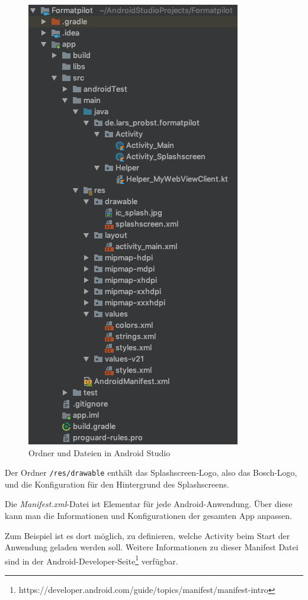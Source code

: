 \begin{figure}[h]
    \centering
    \includegraphics[scale=0.3]{images/kapitel_4/android_folder.png}
    \caption{Ordner und Dateien in Android Studio}
    \label{fig:umsetzung_android_folder}
\end{figure}

Der Ordner \texttt{/res/drawable} enthält das Splashscreen-Logo, also das Bosch-Logo, und die Konfiguration für den
Hintergrund des Splashscreens.

Die \textit{Manifest.xml}-Datei ist Elementar für jede Android-Anwendung. Über diese kann man die Informationen und
Konfigurationen der gesamten App anpassen.

Zum Beispiel ist es dort möglich, zu definieren, welche Activity beim Start der Anwendung geladen werden soll. Weitere
Informationen zu dieser Manifest Datei sind in der
Android-Developer-Seite\footnote{https://developer.android.com/guide/topics/manifest/manifest-intro} verfügbar.

